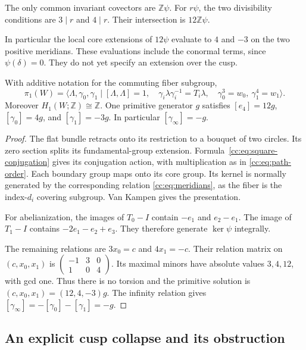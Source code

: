 The only common invariant covectors are $\mathbb Z\psi$.
For $r\psi$, the two divisibility conditions are $3\mid r$ and $4\mid r$.
Their intersection is $12\mathbb Z\psi$.

In particular the local core extensions of $12\psi$ evaluate to $4$ and
$-3$ on the two positive meridians. These evaluations include the
conormal terms, since $\psi(\delta)=0$.
They do not yet specify an extension over the cusp.

\begin{proposition}\label{cc:prop:pi1}
With additive notation for the commuting fiber subgroup,
\[
\pi_1(W)=\langle\Lambda,\gamma_0,\gamma_1\mid
 [\Lambda,\Lambda]=1,\quad
 \gamma_i\lambda\gamma_i^{-1}=T_i\lambda,\quad
 \gamma_0^3=w_0,\ \gamma_1^4=w_1\rangle.
\]
Moreover $H_1(W;\mathbb Z)\cong\mathbb Z$.
One primitive generator $g$ satisfies
$[e_4]=12g$, $[\gamma_0]=4g$, and $[\gamma_1]=-3g$.
In particular $[\gamma_\infty]=-g$.
\end{proposition}

\begin{proof}
The flat bundle retracts onto its restriction to a bouquet of two circles.
Its zero section splits its fundamental-group extension.
Formula~\eqref{cc:eq:square-conjugation} gives its conjugation action,
with multiplication as in \eqref{cc:eq:path-order}.
Each boundary group maps onto its core group. Its kernel is normally
generated by the corresponding relation \eqref{cc:eq:meridians}, as
the fiber is the index-$d_i$ covering subgroup. Van Kampen gives the presentation.

For abelianization, the images of $T_0-I$ contain $-e_1$ and $e_2-e_1$.
The image of $T_1-I$ contains $-2e_1-e_2+e_3$.
They therefore generate $\ker\psi$ integrally.

The remaining relations are $3x_0=c$ and $4x_1=-c$.
Their relation matrix on $(c,x_0,x_1)$ is
$\left(\begin{smallmatrix}-1&3&0\\1&0&4\end{smallmatrix}\right)$.
Its maximal minors have absolute values $3,4,12$, with gcd one.
Thus there is no torsion and the primitive solution is $(c,x_0,x_1)=(12,4,-3)g$.
The infinity relation gives
$[\gamma_\infty]=-[\gamma_0]-[\gamma_1]=-g$.
\end{proof}

\subsection{An explicit cusp collapse and its obstruction}

